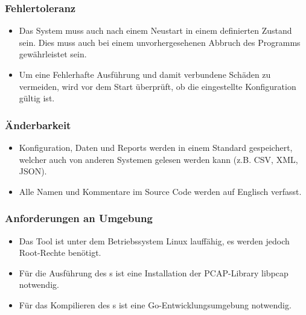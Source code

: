 \subsubsection{Fehlertoleranz}
\begin{itemize}
\item Das System muss auch nach einem Neustart in einem definierten Zustand sein. Dies muss auch bei einem unvorhergesehenen Abbruch des Programms gewährleistet sein. 
\item Um eine Fehlerhafte Ausführung und damit verbundene Schäden zu vermeiden, wird vor dem Start überprüft, ob die eingestellte Konfiguration gültig ist.
\end{itemize}

\subsubsection{Änderbarkeit}
\begin{itemize}
\item Konfiguration, Daten und Reports werden in einem Standard gespeichert, welcher auch von anderen Systemen gelesen werden kann (z.B. CSV, XML, JSON).
\item Alle Namen und Kommentare im Source Code werden auf Englisch verfasst.
\end{itemize}

\subsubsection{Anforderungen an Umgebung}
\begin{itemize}
\item Das Tool ist unter dem Betriebssystem Linux lauffähig, es werden jedoch Root-Rechte benötigt.
\item Für die Ausführung des \tool{}s ist eine Installation der \ac{PCAP}-Library libpcap notwendig.
\item Für das Kompilieren des \tool{}s ist eine Go-Entwicklungsumgebung notwendig.
\end{itemize}